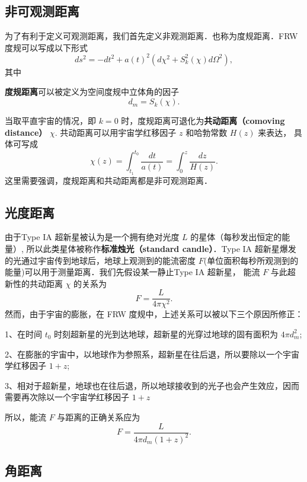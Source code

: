 

\subsection{非可观测距离}
为了有利于定义可观测距离，我们首先定义非观测距离．也称为度规距离．FRW 度规可以写成以下形式
\begin{equation}
ds^2=-dt^2+a(t)^2(d\chi^2+S^2_k (\chi) d\Omega^2),
\end{equation}
其中
\addTODO{[xxx]}

\textbf{度规距离}可以被定义为空间度规中立体角的因子
\begin{equation}
d_m=S_k(\chi).
\end{equation}

当取平直宇宙的情况，即 $k=0$ 时，度规距离可退化为\textbf{共动距离（comoving distance）} $\chi$. 共动距离可以用宇宙学红移因子 $z$ 和哈勃常数 $H(z)$ 来表达， 具体可写成
\begin{equation}
\chi(z)=\int^{t_0}_{t_1} \frac{dt}{a(t)}=\int^z_0 \frac{dz}{H(z)}.
\end{equation}
这里需要强调，度规距离和共动距离都是非可观测距离．

\subsection{光度距离}
由于Type IA 超新星被认为是一个拥有绝对光度 $L$ 的星体（每秒发出恒定的能量）, 所以此类星体被称作\textbf{标准烛光（standard candle）}．Type IA 超新星爆发的光通过宇宙传到地球后，地球上观测到的能流密度 $F$(单位面积每秒所观测到的能量)可以用于测量距离．我们先假设某一静止Type IA 超新星， 能流 $F$ 与此超新性的共动距离 $\chi$ 的关系为
\begin{equation}
F=\frac{L}{4\pi \chi^2}.
\end{equation}
然而，由于宇宙的膨胀，在 FRW 度规中，上述关系可以被以下三个原因所修正：

1、在时间 $t_0$ 时刻超新星的光到达地球，超新星的光穿过地球的固有面积为 $4\pi d_m^2$;

2、在膨胀的宇宙中，以地球作为参照系，超新星在往后退，所以要除以一个宇宙学红移因子 $1+z$;

3、相对于超新星，地球也在往后退，所以地球接收到的光子也会产生效应，因而需要再次除以一个宇宙学红移因子 $1+z$

所以，能流 $F$ 与距离的正确关系应为
\begin{equation}
F=\frac{L}{4\pi d_m (1+z)^2}.
\end{equation}

\subsection{角距离}
